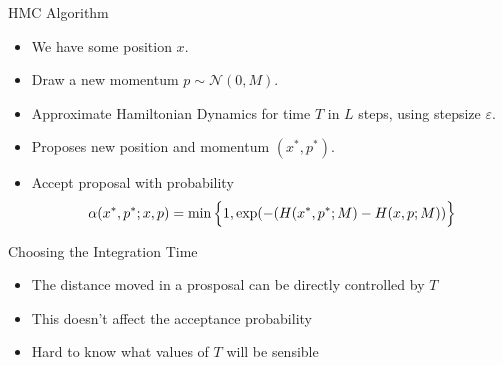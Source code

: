 \documentclass{beamer}
\begin{document}




\begin{frame}{HMC Algorithm}
\begin{itemize}

\item We have some position $x$.

\item Draw a new momentum $ p \sim \mathcal{N}(0, M)$.

\item Approximate Hamiltonian Dynamics for time $T$ in $L$ steps, using stepsize $\varepsilon$. 

\item Proposes new position and momentum $(x^{*}, p^{*})$. 

\item Accept proposal with probability $$ \alpha(x^{*}, p^{*} ;x, p) = \min \Big{\{} 1, \exp(-(H(x^{*}, p^{*};M) - H(x,p;M)) \Big{\}} $$
\end{itemize}

\end{frame}




\begin{frame}{Choosing the Integration Time}

\begin{itemize}

\item The distance moved in a prosposal can be directly controlled by $T$ \vskip 5mm

\item This doesn't affect the acceptance probability \vskip 5mm

\item Hard to know what values of $T$ will be sensible

\end{itemize}

\end{frame}
\end{document}

